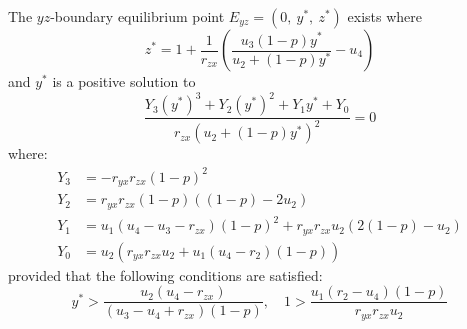 \begin{theorem}\label{thm:eq-boundary-yz-exist}
    The $yz$-boundary equilibrium point $E_{yz}=\left(0,\ y^*,\ z^*\right)$ exists where
    \begin{equation*}
        z^*=1+\frac{1}{r_{zx}}\left(\frac{u_3\left(1-p\right)y^*}{u_2+\left(1-p\right)y^*}-u_4\right)
    \end{equation*}
    and $y^*$ is a positive solution to 
    \begin{equation*}
        \frac{Y_3\left(y^*\right)^3+Y_2\left(y^*\right)^2+Y_1y^*+Y_0}{r_{zx}\left(u_2+\left(1-p\right)y^*\right)^2}=0
    \end{equation*}
    where:
    \begin{align*}
        Y_3 &= -r_{yx}r_{zx}\left(1-p\right)^2\\
        Y_2 &= r_{yx}r_{zx}\left(1-p\right)\left(\left(1-p\right)-2u_2\right)\\
        Y_1 &= u_1\left(u_4-u_3-r_{zx}\right)\left(1-p\right)^2+r_{yx}r_{zx}u_2\left(2\left(1-p\right)-u_2\right)\\
        Y_0 &= u_2\left(r_{yx}r_{zx}u_2+u_1\left(u_4-r_2\right)\left(1-p\right)\right)
    \end{align*}
    provided that the following conditions are satisfied:
    \begin{equation*}
        y^* > \frac{u_2\left(u_4-r_{zx}\right)}{\left(u_3-u_4+r_{zx}\right)\left(1-p\right)},\quad 
        1 > \frac{u_1\left(r_2-u_4\right)\left(1-p\right)}{r_{yx}r_{zx}u_2}
    \end{equation*}
\end{theorem}
